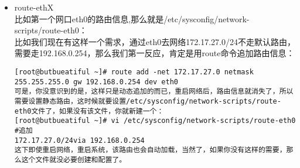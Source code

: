 \begin{itemize}
\item{route-ethX}\\
比如第一个网口eth0的路由信息,那么就是/etc/sysconfig/network-scripts/route-eth0：\\
比如我们现在有这样一个需求，通过eth0去网络172.17.27.0/24不走默认路由，需要走192.168.0.254，那么我们第一反应，肯定是用route命令追加路由信息：\\
\begin{verbatim}
[root@butbueatiful ~]# route add -net 172.17.27.0 netmask 255.255.255.0 gw 192.168.0.254 dev eth0
可是，你没意识到的是，这样只是动态追加的而已，重启网络后，路由信息就消失了，所以需要设置静态路由，这时候就要设置/etc/sysconfig/network-scripts/route-eth0文件了，如果没有该文件，你就新建一个：
[root@butbueatiful ~]# vi /etc/sysconfig/network-scripts/route-eth0
#追加
172.17.27.0/24via 192.168.0.254
这下即使重启网络，重启系统，该路由也会自动加载，当然了，如果你没有这样的需要，那么这个文件就没必要创建和配置了。
\end{verbatim}

\end{itemize}


 
 
 
 
 
 
 
 
 
 
 
